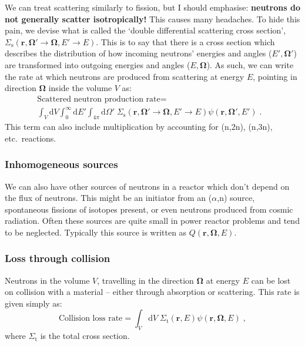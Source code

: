 \documentclass{article}
\begin{document}
We can treat scattering similarly to fission, but I should emphasise: \textbf{neutrons do not generally scatter isotropically!} This causes many headaches. To hide this pain, we devise what is called the `double differential scattering cross section', $\Sigma_\mathrm{s}\left(\mathbf{r},\mathbf{\Omega}'\rightarrow\mathbf{\Omega},E'\rightarrow E\right)$. This is to say that there is a cross section which describes the distribution of how incoming neutrons' energies and angles ($E',\mathbf{\Omega}'$) are transformed into outgoing energies and angles ($E,\mathbf{\Omega}$). As such, we can write the rate at which neutrons are produced from scattering at energy $E$, pointing in direction $\mathbf{\Omega}$ inside the volume $V$ as:
\begin{equation}
\begin{split}
    \textrm{Scattered neutron production rate} = &\\
    \int_V \mathrm{d}V\int^\infty_0 \mathrm{d}E'\int_{4\pi}\mathrm{d}{\Omega}' \;\Sigma_\mathrm{s}\left(\mathbf{r},\mathbf{\Omega}'\rightarrow\mathbf{\Omega},E'\rightarrow E\right)\psi(\mathbf{r},\mathbf{\Omega}',E')\;\mathrm{.}
\end{split}
\end{equation}
This term can also include multiplication by accounting for (n,2n), (n,3n), etc.~reactions.

\subsubsection{Inhomogeneous sources}
We can also have other sources of neutrons in a reactor which don't depend on the flux of neutrons. This might be an initiator from an ($\alpha$,n) source, spontaneous fissions of isotopes present, or even neutrons produced from cosmic radiation. Often these sources are quite small in power reactor problems and tend to be neglected. Typically this source is written as $Q(\mathbf{r},\mathbf{\Omega},E)$.

\subsubsection{Loss through collision}
Neutrons in the volume $V$, travelling in the direction $\mathbf{\Omega}$ at energy $E$ can be lost on collision with a material -- either through absorption or scattering. This rate is given simply as:
\begin{equation}
    \textrm{Collision loss rate} = \int_V \mathrm{d}V\; \Sigma_\mathrm{t}(\mathbf{r},E) \psi (\mathbf{r},\mathbf{\Omega},E)\;\mathrm{,}
\end{equation}
where $\Sigma_\mathrm{t}$ is the total cross section.
\end{document}

